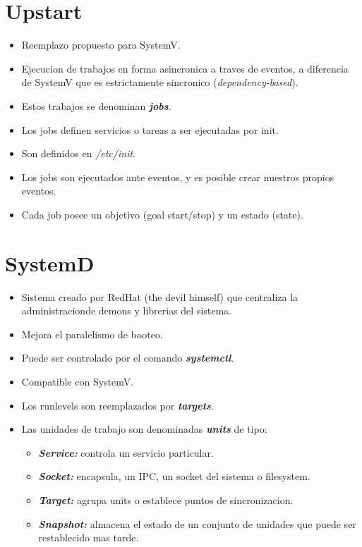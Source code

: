 \documentclass[11pt]{article}
\begin{document}
\section{Upstart}
\begin{itemize}
    \item Reemplazo propuesto para SystemV.
    \item Ejecucion de trabajos en forma asincronica a traves de eventos, a diferencia de SystemV que es estrictamente sincronico (\textit{dependency-based}).
    \item Estos trabajos se denominan \textbf{\textit{jobs}}.
    \item Los jobs definen servicios o tareas a ser ejecutadas por init.
    \item Son definidos en \textit{/etc/init}.
    \item Los jobs son ejecutados ante eventos, y es posible crear nuestros propios eventos.
    \item Cada job posee un objetivo (goal start/stop) y un estado (state).
\end{itemize}

\section{SystemD}

\begin{itemize}
    \item Sistema creado por RedHat (the devil himself) que centraliza la administracionde demons y librerias del sistema.
    \item Mejora el paralelismo de booteo.
    \item Puede ser controlado por el comando \textbf{\textit{systemctl}}.
    \item Compatible con SystemV.
    \item Los runlevels son reemplazados por \textbf{\textit{targets}}.
    \item Las unidades de trabajo son denominadas \textbf{\textit{units}} de tipo:
    \begin{itemize}
        \item \textbf{\textit{Service:}} controla un servicio particular.
        \item \textbf{\textit{Socket:}} encapsula, un IPC, un socket del sistema o filesystem.
        \item \textbf{\textit{Target:}} agrupa units o establece puntos de sincronizacion.
        \item \textbf{\textit{Snapshot:}} almacena el estado de un conjunto de unidades que puede ser restablecido mas tarde.
    \end{itemize}
\end{itemize}
\end{document}
